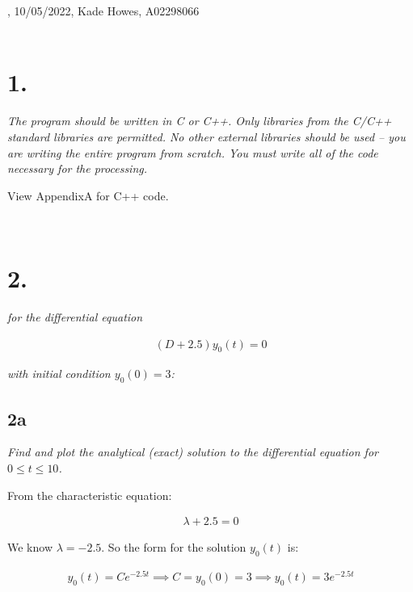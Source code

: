 \documentclass[10pt, AMS Euler]{article}
\begin{document}
, 10/05/2022, Kade Howes, A02298066\\

\noindent \underline{\hspace{7in}}\\
\section*{1.}
\textit{The program should be written in C or C++. Only libraries from the C/C++ standard libraries
are permitted. No other external libraries should be used – you are writing the entire program from
scratch. You must write all of the code necessary for the processing.}

View AppendixA for C++ code.

\noindent \underline{\hspace{7in}}\\
\section*{2.}
\textit{for the differential equation}
\begin{center}
    \begin{align*}
        (D + 2.5)y_0(t) = 0
    \end{align*}
\end{center}

\textit{with initial condition $y_0(0) = 3$:}

\subsection*{2a}

\textit{Find and plot the analytical (exact) solution to the differential equation for $0 \le t \le 10$.}

From the characteristic equation:
\begin{center}
    \begin{align*}
        \lambda + 2.5 = 0
    \end{align*}
\end{center}

We know $\lambda = -2.5$. So the form for the solution $y_0(t)$ is: 
\begin{center}
    \begin{align*}
        y_0(t) = Ce^{-2.5t}
        \implies C = y_0(0) = 3
        \implies y_0(t) = 3e^{-2.5t}
    \end{align*}
\end{center}
\end{document}

